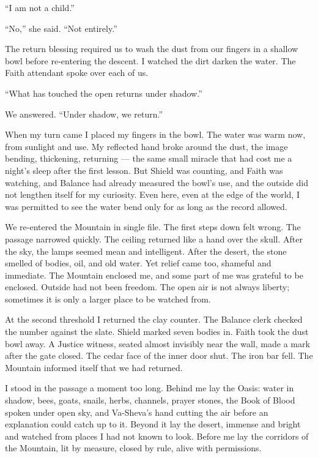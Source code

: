 ``I am not a child.''\par

``No,'' she said. ``Not entirely.''\par

The return blessing required us to wash the dust from our fingers in a shallow bowl before re-entering the descent. I watched the dirt darken the water. The Faith attendant spoke over each of us.\par

``What has touched the open returns under shadow.''\par

We answered. ``Under shadow, we return.''\par

When my turn came I placed my fingers in the bowl. The water was warm now, from sunlight and use. My reflected hand broke around the dust, the image bending, thickening, returning --- the same small miracle that had cost me a night's sleep after the first lesson. But Shield was counting, and Faith was watching, and Balance had already measured the bowl's use, and the outside did not lengthen itself for my curiosity. Even here, even at the edge of the world, I was permitted to see the water bend only for as long as the record allowed.\par

We re-entered the Mountain in single file. The first steps down felt wrong. The passage narrowed quickly. The ceiling returned like a hand over the skull. After the sky, the lamps seemed mean and intelligent. After the desert, the stone smelled of bodies, oil, and old water. Yet relief came too, shameful and immediate. The Mountain enclosed me, and some part of me was grateful to be enclosed. Outside had not been freedom. The open air is not always liberty; sometimes it is only a larger place to be watched from.\par

At the second threshold I returned the clay counter. The Balance clerk checked the number against the slate. Shield marked seven bodies in. Faith took the dust bowl away. A Justice witness, seated almost invisibly near the wall, made a mark after the gate closed. The cedar face of the inner door shut. The iron bar fell. The Mountain informed itself that we had returned.\par

I stood in the passage a moment too long. Behind me lay the Oasis: water in shadow, bees, goats, snails, herbs, channels, prayer stones, the Book of Blood spoken under open sky, and Va-Sheva's hand cutting the air before an explanation could catch up to it. Beyond it lay the desert, immense and bright and watched from places I had not known to look. Before me lay the corridors of the Mountain, lit by measure, closed by rule, alive with permissions.\par

